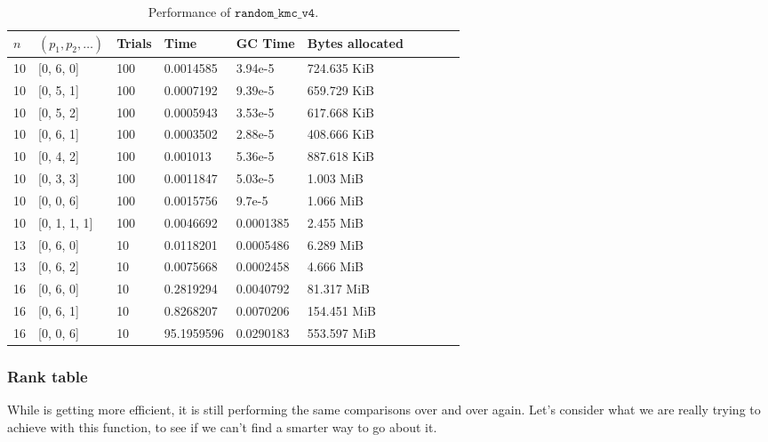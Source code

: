 \begin{table}[ht!]
  \centering
    \begin{tabular}{llllllllll}
      \toprule
      $n$ & $(p_1, p_2, \ldots)$ & Trials & Time  & GC Time & Bytes allocated \\
      \midrule
      10 & [0, 6, 0]    & 100 & 0.0014585  & 3.94e-5   & 724.635 KiB \\ 
      10 & [0, 5, 1]    & 100 & 0.0007192  & 9.39e-5   & 659.729 KiB \\ 
      10 & [0, 5, 2]    & 100 & 0.0005943  & 3.53e-5   & 617.668 KiB \\ 
      10 & [0, 6, 1]    & 100 & 0.0003502  & 2.88e-5   & 408.666 KiB \\ 
      10 & [0, 4, 2]    & 100 & 0.001013   & 5.36e-5   & 887.618 KiB \\ 
      10 & [0, 3, 3]    & 100 & 0.0011847  & 5.03e-5   & 1.003 MiB   \\ 
      10 & [0, 0, 6]    & 100 & 0.0015756  & 9.7e-5    & 1.066 MiB   \\ 
      10 & [0, 1, 1, 1] & 100 & 0.0046692  & 0.0001385 & 2.455 MiB   \\ 
      13 & [0, 6, 0]    & 10  & 0.0118201  & 0.0005486 & 6.289 MiB   \\ 
      13 & [0, 6, 2]    & 10  & 0.0075668  & 0.0002458 & 4.666 MiB   \\ 
      16 & [0, 6, 0]    & 10  & 0.2819294  & 0.0040792 & 81.317 MiB  \\ 
      16 & [0, 6, 1]    & 10  & 0.8268207  & 0.0070206 & 154.451 MiB \\ 
      16 & [0, 0, 6]    & 10  & 95.1959596 & 0.0290183 & 553.597 MiB \\ 
      \bottomrule
    \end{tabular}
  \caption{Performance of $\texttt{random\_kmc\_v4}$.}
  \label{tab:perf_v4}
\end{table}

\subsubsection{Rank table}
While  is getting more efficient, it is still performing the same comparisons over and over again. Let's consider what we are really trying to achieve with this function, to see if we can't find a smarter way to go about it.

